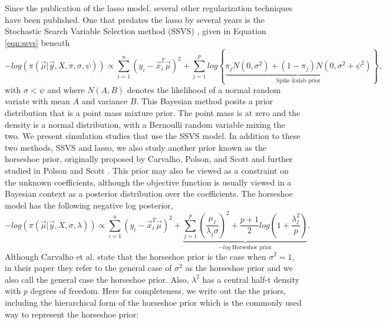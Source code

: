 Since the publication of the lasso model, several other regularization techniques have been published. One that predates the lasso by several years is the Stochastic Search Variable Selection method (SSVS) \cite{george1993variable}, given in Equation \ref{eqn:ssvs} beneath
	\begin{equation}\label{eqn:lasso_obj}
		-log(\pi(\vec{\mu} \vert \vec{y}, X, \pi, \sigma, \psi )) \propto \sum_{i=1}^n\left(y_i - \vec{x}_i^T\vec{\mu}\right)^2 + \sum_{j=1}^p log\left\{\underbrace{ \pi_jN(0, \sigma^2)+(1-\pi_j)N(0, \sigma^2+ \psi^2)}_{\text{Spike \& slab prior}}  \right\},
		\end{equation}
with $\sigma < \psi$ and where $N(A,B)$ denotes the likelihood of a normal random variate with mean $A$ and variance $B$. This Bayesian method posits a prior distribution that is a point mass mixture prior. The point mass is at zero and the density is a normal distribution, with a Bernoulli random variable mixing the two. %
We present simulation studies that use the SSVS model. In addition to these two methods, SSVS and lasso, we also study another prior known as the horseshoe prior, originally proposed by Carvalho, Polson, and Scott \cite{carvalho2010horseshoe} and further studied in Polson and Scott \cite{polson2010shrink}. This prior may also be viewed as a constraint on the unknown coefficients, although the objective function is usually viewed in a Bayesian context as a posterior distribution over the coefficients. The horseshoe model has the following negative log posterior, 
\begin{equation}\label{eqn:horseshoe}
		-log(\pi(\vec{\mu} \vert \vec{y}, X, \sigma, \lambda )) \propto \sum_{i=1}^n\left(y_i - \vec{x}_i^T\vec{\mu}\right)^2 + \underbrace{\sum_{j=1}^p\left(\frac{\mu_j}{\lambda_j\sigma} \right)^2 + \frac{p+1}{2}log\left(1+ \frac{\lambda_j^2}{p}\right)}_{ \text{$-log$ Horseshoe prior} }.\end{equation}
\noindent Although Carvalho et al.  \cite{carvalho2010horseshoe} state that the horseshoe prior is the case when $\sigma^2=1$, in their paper they refer to the general case of $\sigma^2$ as the horseshoe prior and we also call the general case the horseshoe prior. Also, $\lambda^2$ has a central half-t density with $p$ degrees of freedom. Here for completeness, we write out the the priors, including the hierarchical form of the horseshoe prior which is the commonly used way to represent the horseshoe prior:

